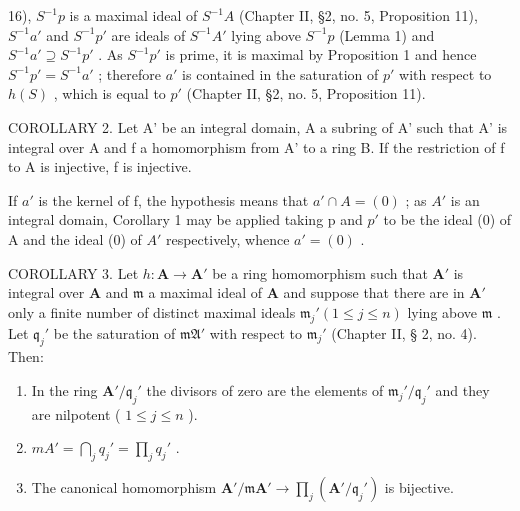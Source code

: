 16), \(S^{-1}p\) is a maximal ideal of \(S^{-1}A\) (Chapter II, §2, no. 5, Proposition 11), \(S^{-1}a'\) and \(S^{-1}p'\) are ideals of \(S^{-1}A'\) lying above \(S^{-1}p\) (Lemma 1) and \(S^{-1}a' \supseteq S^{-1}p'\) . As \(S^{-1}p'\) is prime, it is maximal by Proposition 1 and hence \(S^{-1}p' = S^{-1}a'\) ; therefore \(a'\) is contained in the saturation of \(p'\) with respect to \(h(S)\) , which is equal to \(p'\) (Chapter II, §2, no. 5, Proposition 11).

COROLLARY 2. Let A' be an integral domain, A a subring of A' such that A' is integral over A and f a homomorphism from A' to a ring B. If the restriction of f to A is injective, f is injective.

If \(a'\) is the kernel of f, the hypothesis means that \(a' \cap A = (0)\) ; as \(A'\) is an integral domain, Corollary 1 may be applied taking p and \(p'\) to be the ideal (0) of A and the ideal (0) of \(A'\) respectively, whence \(a' = (0)\) .

COROLLARY 3. Let \(h: \mathbf{A} \to \mathbf{A}'\) be a ring homomorphism such that \(\mathbf{A}'\) is integral over \(\mathbf{A}\) and \(\mathfrak{m}\) a maximal ideal of \(\mathbf{A}\) and suppose that there are in \(\mathbf{A}'\) only a finite number of distinct maximal ideals \(\mathfrak{m}_j' (1 \leqslant j \leqslant n)\) lying above \(\mathfrak{m}\) . Let \(\mathfrak{q}_j'\) be the saturation of \(\mathfrak{mA}'\) with respect to \(\mathfrak{m}_j'\) (Chapter II, § 2, no. 4). Then:

\begin{enumerate}
\def\labelenumi{(\roman{enumi})}
\item
  In the ring \(\mathbf{A}' / \mathfrak{q}_j'\) the divisors of zero are the elements of \(\mathfrak{m}_j' / \mathfrak{q}_j'\) and they are nilpotent ( \(1 \leqslant j \leqslant n\) ).
\item
  \(mA' = \bigcap_{j} q_{j}' = \prod_{j} q_{j}'\) .
\item
  The canonical homomorphism \(\mathbf{A}' / \mathfrak{m}\mathbf{A}' \to \prod_j (\mathbf{A}' / \mathfrak{q}_j')\) is bijective.
\end{enumerate}

